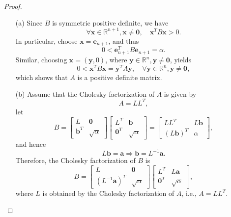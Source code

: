 \begin{proof}
  \begin{itemize}
  \item[(a)]
    Since $B$ is symmetric positive definite, we have
    \begin{displaymath}
      \forall \mathbf{x}\in\mathbb{R}^{n+1}, \mathbf{x}\neq\mathbf{0}, \quad 
      \mathbf{x}^TB\mathbf{x} > 0.
    \end{displaymath}
    In particular, choose $\mathbf{x}=\mathbf{e}_{n+1}$,
    and thus
    \begin{displaymath}
      0< \mathbf{e}_{n+1}^TB\mathbf{e}_{n+1} = \alpha.
    \end{displaymath}
    Similar, choosing $\mathbf{x}=(\mathbf{y}, 0)$,
    where $\mathbf{y}\in\mathbb{R}^n, \mathbf{y}\neq \mathbf{0}$, yields
    \begin{displaymath}
      0< \mathbf{x}^TB\mathbf{x} = \mathbf{y}^TA\mathbf{y}, \quad \forall \mathbf{y}\in\mathbb{R}^n, \mathbf{y}\neq\mathbf{0},
    \end{displaymath}
    which shows that $A$ is a positive definite matrix.

  \item[(b)]
    Assume that the Cholesky factorization of $A$ is given by
    \begin{displaymath}
      A = LL^T,
    \end{displaymath}
    let
    \begin{displaymath}
      B =
      \begin{bmatrix}
        L & \mathbf{0} \\
        \mathbf{b}^T & \sqrt{\alpha}
      \end{bmatrix}
      \begin{bmatrix}
        L^T & \mathbf{b} \\
        \mathbf{0}^T & \sqrt{\alpha}
      \end{bmatrix}
      =
      \begin{bmatrix}
        LL^T & L\mathbf{b} \\
        (L\mathbf{b})^T & \alpha
      \end{bmatrix},
    \end{displaymath}
    and hence
    \begin{displaymath}
      L\mathbf{b} = \mathbf{a} \Rightarrow \mathbf{b} = L^{-1}\mathbf{a}.
    \end{displaymath}
    Therefore, the Cholesky factorization of $B$ is
    \begin{displaymath}
      B =
            \begin{bmatrix}
        L & \mathbf{0} \\
        (L^{-1}\mathbf{a})^T & \sqrt{\alpha}
      \end{bmatrix}
      \begin{bmatrix}
        L^T & L\mathbf{a} \\
        \mathbf{0}^T & \sqrt{\alpha}
      \end{bmatrix},
    \end{displaymath}
    where $L$ is obtained by the Cholesky factorization of $A$,
    i.e.,
    $A = LL^T$.
  \end{itemize}
  
\end{proof}

